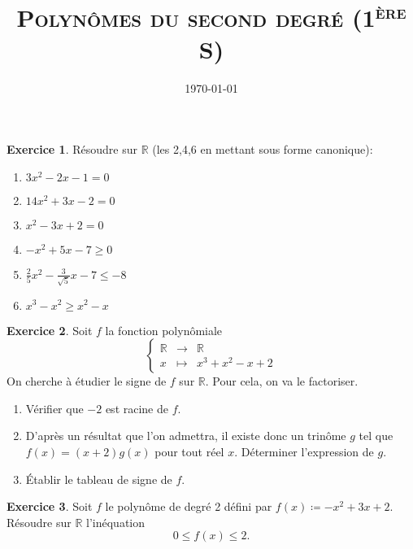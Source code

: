 \documentclass{article}
\title{\textsc{Polynômes du second degré (1\textsuperscript{ère} S)} }
\author{}
\date{\today}
\theoremstyle{definition}
\newtheorem{exo}{Exercice}
\newcommand{\R}{\mathbb R}
\begin{document}
\maketitle

\begin{exo} Résoudre sur $\R$ (les 2,4,6 en mettant sous forme canonique):
    \begin{multicols}{2}
        \begin{enumerate}
            \item $3x^2-2x-1=0$
            \item $14x^2 + 3x - 2 = 0$
            \item $x^2 - 3x + 2 = 0$
            \item $-x^2 + 5x - 7 \geq 0$
            \item $\frac{2}{5}x^2 - \frac{3}{\sqrt{5}}x - 7 \leq -8$
            \item $x^3-x^2 \geq x^2 -x$
        \end{enumerate}
    \end{multicols}
\end{exo}

\begin{exo} Soit $f$ la fonction polynômiale
    \begin{equation*}
        \left\{\begin{array}{lcl}
            \R &\longrightarrow &\R \\
            x &\longmapsto & x^3 + x^2 - x + 2
        \end{array}\right.
    \end{equation*}
    On cherche à étudier le signe de $f$ sur $\R$. Pour cela, on va le factoriser.
    \begin{enumerate}
        \item Vérifier que $-2$ est racine de $f$.
        \item D'après un résultat que l'on admettra, il existe donc un trinôme $g$ tel que $f(x) = (x+2)g(x)$ pour tout réel $x$. Déterminer l'expression de $g$.
        \item Établir le tableau de signe de $f$.
    \end{enumerate}
\end{exo}

\begin{exo}
    Soit $f$ le polynôme de degré 2 défini par $f(x)\coloneqq -x^2+3x+2$. Résoudre sur $\R$ l'inéquation
    \[
    0\leq f(x) \leq 2.
    \]
\end{exo}
\end{document}
